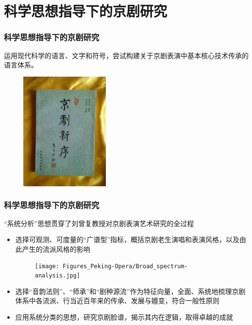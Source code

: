 \section{科学思想指导下的京剧研究}
\frame
{
	\frametitle{科学思想指导下的京剧研究}
	运用现代科学的语言、文字和符号，尝试构建关于京剧表演中基本核心技术传承的语言体系。
\begin{figure}[h!]
\centering
\vspace{-0.1in}
\includegraphics[height=0.58\textwidth,width=0.40\textwidth,viewport=100 85 660 875,clip]{Figures_Peking-Opera/Liu_Xinxu.jpg}
\label{Liu_Xinxu}
\end{figure}
}

\frame
{
	\frametitle{科学思想指导下的京剧研究}
``系统分析''思想贯穿了刘曾复教授对京剧表演艺术研究的全过程
	\begin{itemize}
		\item 选择可观测、可度量的``广谱型''指标，概括京剧老生演唱和表演风格，以及由此产生的流派风格的影响%
\begin{figure}[h!]
\centering
\vspace{-0.1in}
\texttt{[image: Figures\_Peking-Opera/Broad\_spectrum-analysis.jpg]}
\label{Liu_Xinxu-Analysis}
\end{figure}
\item 选择``音韵法则''、``师承''和``剧种源流''作为特征向量，全面、系统地梳理京剧体系中各流派、行当近百年来的传承、发展与嬗变，符合一般性原则
\item 应用系统分类的思想，研究京剧脸谱，揭示其内在逻辑，取得卓越的成就
	\end{itemize}
}

